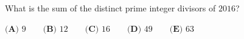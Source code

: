 What is the sum of the distinct prime integer divisors of $2016$?

$\textbf{(A) }9\qquad\textbf{(B) }12\qquad\textbf{(C) }16\qquad\textbf{(D) }49\qquad\textbf{(E) }63$
